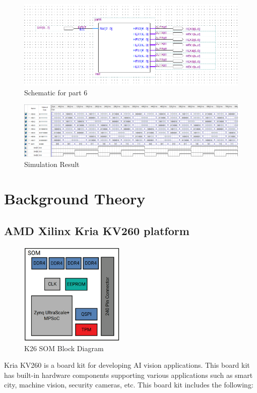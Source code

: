 \documentclass[a4paper, 12pt]{report}
\begin{document}
\clearpage



\begin{figure}[h]
    \centering
    \includegraphics[width = \textwidth]{source/picture/Lab1/Lab1_6.png}
    \caption{Schematic for part 6}
\end{figure}

\begin{figure}[h]
    \centering
    \includegraphics[scale = 0.40]{source/picture/Lab1/Lab1_wave.png}
    \caption{Simulation Result}
\end{figure}
\chapter{Background Theory}
\section{AMD Xilinx Kria KV260 platform}
\begin{center}
    \begin{figure}[H]
        \begin{center}
            \includegraphics[width=5cm]{picture/kria/block_diagram.png}
        \end{center}
        \caption{K26 SOM Block Diagram}
        \label{ref Figure}
    \end{figure}
\end{center}
Kria KV260 is a board kit for developing AI vision applications. This
board kit has built-in hardware components supporting various applications such as smart city, machine vision, security cameras, etc. This board kit includes the following:
\end{document}
